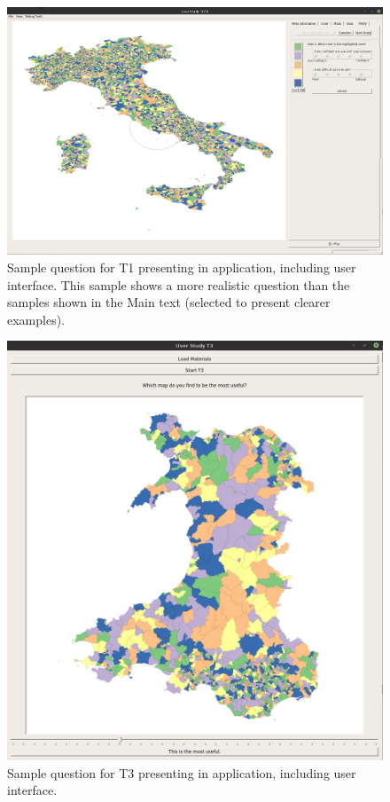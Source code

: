 \begin{figure}[t]
 \centering
\includegraphics[scale=0.35, angle=90]{images/T1.png}
\caption{Sample question for T1 presenting in application, including user interface. This sample shows a more realistic question than the samples shown in the Main text (selected to present clearer examples).} \label{fig:t1}
\end{figure}
\begin{figure}[t]
 \centering
\includegraphics[width=1\textwidth]{images/T2.png}
\caption{Sample question for T3 presenting in application, including user interface.} \label{fig:t3}
\end{figure}

